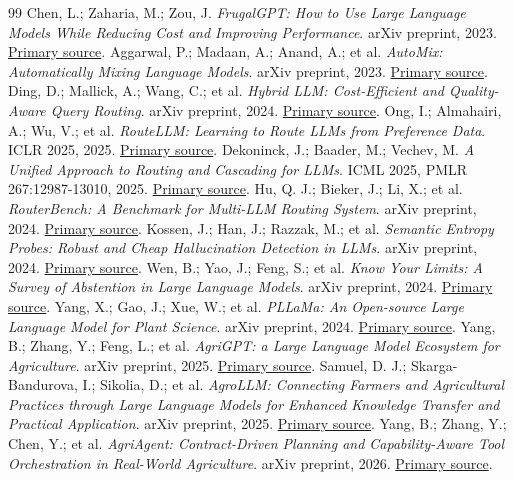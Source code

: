 \documentclass[14pt,a4paper]{extarticle}
\begin{document}
\begin{thebibliography}{99}\fontsize{12}{14}\selectfont
{}Chen, L.; Zaharia, M.; Zou, J. \emph{FrugalGPT: How to Use Large Language Models While Reducing Cost and Improving Performance}. arXiv preprint, 2023. \href{https://arxiv.org/abs/2305.05176}{Primary source}.
Aggarwal, P.; Madaan, A.; Anand, A.; et al. \emph{AutoMix: Automatically Mixing Language Models}. arXiv preprint, 2023. \href{https://arxiv.org/abs/2310.12963}{Primary source}.
Ding, D.; Mallick, A.; Wang, C.; et al. \emph{Hybrid LLM: Cost-Efficient and Quality-Aware Query Routing}. arXiv preprint, 2024. \href{https://arxiv.org/abs/2404.14618}{Primary source}.
Ong, I.; Almahairi, A.; Wu, V.; et al. \emph{RouteLLM: Learning to Route LLMs from Preference Data}. ICLR 2025, 2025. \href{https://proceedings.iclr.cc/paper_files/paper/2025/hash/5503a7c69d48a2f86fc00b3dc09de686-Abstract-Conference.html}{Primary source}.
Dekoninck, J.; Baader, M.; Vechev, M. \emph{A Unified Approach to Routing and Cascading for LLMs}. ICML 2025, PMLR 267:12987-13010, 2025. \href{https://proceedings.mlr.press/v267/dekoninck25a.html}{Primary source}.
Hu, Q. J.; Bieker, J.; Li, X.; et al. \emph{RouterBench: A Benchmark for Multi-LLM Routing System}. arXiv preprint, 2024. \href{https://arxiv.org/abs/2403.12031}{Primary source}.
Kossen, J.; Han, J.; Razzak, M.; et al. \emph{Semantic Entropy Probes: Robust and Cheap Hallucination Detection in LLMs}. arXiv preprint, 2024. \href{https://arxiv.org/abs/2406.15927}{Primary source}.
Wen, B.; Yao, J.; Feng, S.; et al. \emph{Know Your Limits: A Survey of Abstention in Large Language Models}. arXiv preprint, 2024. \href{https://arxiv.org/abs/2407.18418}{Primary source}.
Yang, X.; Gao, J.; Xue, W.; et al. \emph{PLLaMa: An Open-source Large Language Model for Plant Science}. arXiv preprint, 2024. \href{https://arxiv.org/abs/2401.01600}{Primary source}.
Yang, B.; Zhang, Y.; Feng, L.; et al. \emph{AgriGPT: a Large Language Model Ecosystem for Agriculture}. arXiv preprint, 2025. \href{https://arxiv.org/abs/2508.08632}{Primary source}.
Samuel, D. J.; Skarga-Bandurova, I.; Sikolia, D.; et al. \emph{AgroLLM: Connecting Farmers and Agricultural Practices through Large Language Models for Enhanced Knowledge Transfer and Practical Application}. arXiv preprint, 2025. \href{https://arxiv.org/abs/2503.04788}{Primary source}.
Yang, B.; Zhang, Y.; Chen, Y.; et al. \emph{AgriAgent: Contract-Driven Planning and Capability-Aware Tool Orchestration in Real-World Agriculture}. arXiv preprint, 2026. \href{https://arxiv.org/abs/2601.08308}{Primary source}.

\end{thebibliography}
\end{document}
